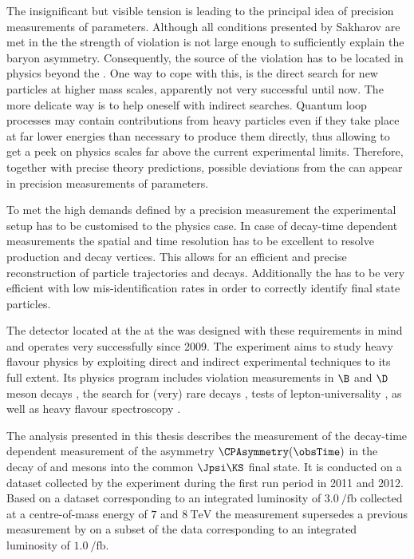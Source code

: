 The insignificant but visible tension is leading to the principal idea of
precision measurements of \CKM parameters. Although all conditions presented by
Sakharov are met in the \SM the strength of \CP violation is not large enough to
sufficiently explain the baryon asymmetry. Consequently, the source of the \CP
violation has to be located in physics beyond the \SM. One way to cope with
this, is the direct search for new particles at higher mass scales, apparently
not very successful until now. The more delicate way is to help oneself with
indirect searches. Quantum loop processes may contain contributions from heavy
particles even if they take place at far lower energies than necessary to
produce them directly, thus allowing to get a peek on physics scales far above
the current experimental limits. Therefore, together with precise theory
predictions, possible deviations from the \SM can appear in precision
measurements of \SM parameters.

To met the high demands defined by a precision measurement the experimental
setup has to be customised to the physics case. In case of decay-time dependent
measurements the spatial and time resolution has to be excellent to resolve
production and decay vertices. This allows for an efficient and precise
reconstruction of particle trajectories and decays. Additionally the \PID has to
be very efficient with low mis-identification rates in order to correctly
identify final state particles.

The \LHCb detector located at the \LHC at the \CERN was designed with these
requirements in mind and operates very successfully since 2009. The \LHCb
experiment aims to study heavy flavour physics by exploiting direct and indirect
experimental techniques to its full extent. Its physics program includes \CP
violation measurements in $\B$ and $\D$ meson decays
\cite{Aaij:2015tza,Aaij:2015yda,Aaij:2014uva,Aaij:2014fba,Aaij:2014dka,Aaij:2014zsa,Aaij:2014kxa}, 
the search for (very) rare decays \cite{CMS:2014xfa}, tests of
lepton-universality \cite{Aaij:2014ora,Aaij:2015yra}, as well as heavy flavour
spectroscopy \cite{Aaij:2014yka,Aaij:2015tga}.

The analysis presented in this thesis describes the measurement of the
decay-time dependent measurement of the \CP asymmetry $\CPAsymmetry(\obsTime)$
in the decay of \Bd and \Bdbar mesons into the common $\Jpsi\KS$ final state. It
is conducted on a dataset collected by the \LHCb experiment during the first
\LHC run period in 2011 and 2012. Based on a dataset corresponding to an
integrated luminosity of $\SI{3.0}{\per\femto\barn}$ collected at a
centre-of-mass energy of $\num{7}$ and $\SI{8}{\TeV}$ the measurement supersedes
a previous measurement by \LHCb \cite{Aaij:1497268} on a subset of the data
corresponding to an integrated luminosity of $\SI{1.0}{\per\femto\barn}$.


